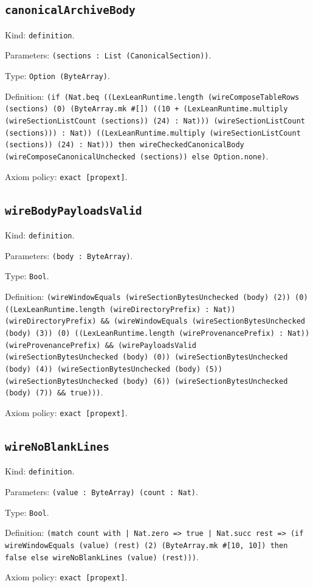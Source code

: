 \documentclass[11pt]{article}
\begin{document}
\subsection*{\texttt{canonicalArchiveBody}}
\noindent Kind: \texttt{definition}.\par
\noindent Parameters: \texttt{(sections : List (CanonicalSection))}.\par
\noindent Type: \texttt{Option (ByteArray)}.\par
\noindent Definition: \texttt{(if (Nat.beq ((LexLeanRuntime.length (wireComposeTableRows (sections) (0) (ByteArray.mk \#[]) ((10 + (LexLeanRuntime.multiply (wireSectionListCount (sections)) (24) : Nat))) (wireSectionListCount (sections))) : Nat)) ((LexLeanRuntime.multiply (wireSectionListCount (sections)) (24) : Nat))) then wireCheckedCanonicalBody (wireComposeCanonicalUnchecked (sections)) else Option.none)}.\par
\noindent Axiom policy: \texttt{exact [propext]}.\par
\subsection*{\texttt{wireBodyPayloadsValid}}
\noindent Kind: \texttt{definition}.\par
\noindent Parameters: \texttt{(body : ByteArray)}.\par
\noindent Type: \texttt{Bool}.\par
\noindent Definition: \texttt{(wireWindowEquals (wireSectionBytesUnchecked (body) (2)) (0) ((LexLeanRuntime.length (wireDirectoryPrefix) : Nat)) (wireDirectoryPrefix) \&\& (wireWindowEquals (wireSectionBytesUnchecked (body) (3)) (0) ((LexLeanRuntime.length (wireProvenancePrefix) : Nat)) (wireProvenancePrefix) \&\& (wirePayloadsValid (wireSectionBytesUnchecked (body) (0)) (wireSectionBytesUnchecked (body) (4)) (wireSectionBytesUnchecked (body) (5)) (wireSectionBytesUnchecked (body) (6)) (wireSectionBytesUnchecked (body) (7)) \&\& true)))}.\par
\noindent Axiom policy: \texttt{exact [propext]}.\par
\subsection*{\texttt{wireNoBlankLines}}
\noindent Kind: \texttt{definition}.\par
\noindent Parameters: \texttt{(value : ByteArray) (count : Nat)}.\par
\noindent Type: \texttt{Bool}.\par
\noindent Definition: \texttt{(match count with | Nat.zero => true | Nat.succ rest => (if wireWindowEquals (value) (rest) (2) (ByteArray.mk \#[10, 10]) then false else wireNoBlankLines (value) (rest)))}.\par
\noindent Axiom policy: \texttt{exact [propext]}.\par
\end{document}
